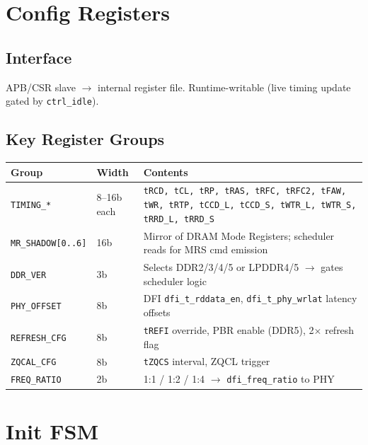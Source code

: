 \documentclass[11pt,a4paper]{article}
\begin{document}
\section{Config Registers}

\subsection*{Interface}
APB/CSR slave $\rightarrow$ internal register file. Runtime-writable (live
timing update gated by \texttt{ctrl\_idle}).

\subsection*{Key Register Groups}

\begin{center}
\begin{tabularx}{\linewidth}{@{} l l X @{}}
\toprule
\textbf{Group} & \textbf{Width} & \textbf{Contents} \\
\midrule
\texttt{TIMING\_*} & 8--16b each &
  \texttt{tRCD, tCL, tRP, tRAS, tRFC, tRFC2, tFAW, tWR, tRTP,
          tCCD\_L, tCCD\_S, tWTR\_L, tWTR\_S, tRRD\_L, tRRD\_S} \\
\addlinespace
\texttt{MR\_SHADOW[0..6]} & 16b &
  Mirror of DRAM Mode Registers; scheduler reads for MRS cmd emission \\
\addlinespace
\texttt{DDR\_VER} & 3b &
  Selects DDR2/3/4/5 or LPDDR4/5 $\rightarrow$ gates scheduler logic \\
\addlinespace
\texttt{PHY\_OFFSET} & 8b &
  DFI \texttt{dfi\_t\_rddata\_en}, \texttt{dfi\_t\_phy\_wrlat} latency offsets \\
\addlinespace
\texttt{REFRESH\_CFG} & 8b &
  \texttt{tREFI} override, PBR enable (DDR5), 2$\times$ refresh flag \\
\addlinespace
\texttt{ZQCAL\_CFG} & 8b &
  \texttt{tZQCS} interval, ZQCL trigger \\
\addlinespace
\texttt{FREQ\_RATIO} & 2b &
  1:1 / 1:2 / 1:4 $\rightarrow$ \texttt{dfi\_freq\_ratio} to PHY \\
\bottomrule
\end{tabularx}
\end{center}

\section{Init FSM}
\end{document}
